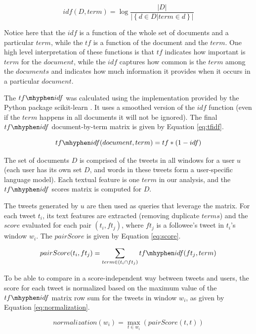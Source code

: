 \begin{equation}
idf(D,term) = \log \frac{|D|}{|\left\{d \in D | term \in d\right\}|}
\label{eq:idf}
\end{equation}

Notice here that the $idf$ is a function of the whole set of documents and a particular $term$, while the $tf$ is a function of the document and the $term$.
One high level interpretation of these functions is that $tf$ indicates how important is $term$ for the $document$, while the $idf$ captures how common is the $term$ among the $documents$ and indicates how much information it provides when it occurs in a particular $document$.

The $tf\mhyphen idf$ was calculated using the implementation provided by the Python package scikit-learn \cite{scikit-learn}. It uses a smoothed version of the $idf$ function (even if the $term$ happens in all documents it will not be ignored). The final $tf\mhyphen idf$ document-by-term matrix is given by Equation \ref{eq:tfidf}.

\begin{equation}
tf\mhyphen idf(document,term) = tf*(1-idf)
\label{eq:tfidf}
\end{equation}

The set of documents $D$ is comprised of the tweets in all windows for a user $u$ (each user has its own set $D$, and words in these tweets form a user-specific language model). Each textual feature is one $term$ in our analysis, and the $tf\mhyphen idf$ scores matrix is computed for $D$. 

The tweets generated by $u$ are then used as queries that leverage the matrix.  For each tweet $t_i$, its text features are extracted (removing duplicate $terms$) and the $score$ evaluated for each pair $(t_i,ft_j)$, where $ft_j$ is a followee's tweet in $t_i$'s window $w_i$. The $pairScore$ is given by Equation \ref{eq:score}.

\begin{equation}
pairScore(t_i,ft_j) = \sum_{term \in \left(t_i \cap ft_j\right)}{tf\mhyphen idf(ft_j,term)}
\label{eq:score}
\end{equation}

To be able to compare in a score-independent way between tweets and users, the score for each tweet is normalized based on the maximum value of the $tf\mhyphen idf$ matrix row sum for the tweets in window $w_i$, as given by Equation \ref{eq:normalization}.

\begin{equation}
normalization(w_i) = \max_{t \in w_i}(pairScore(t,t))
\label{eq:normalization}
\end{equation}

